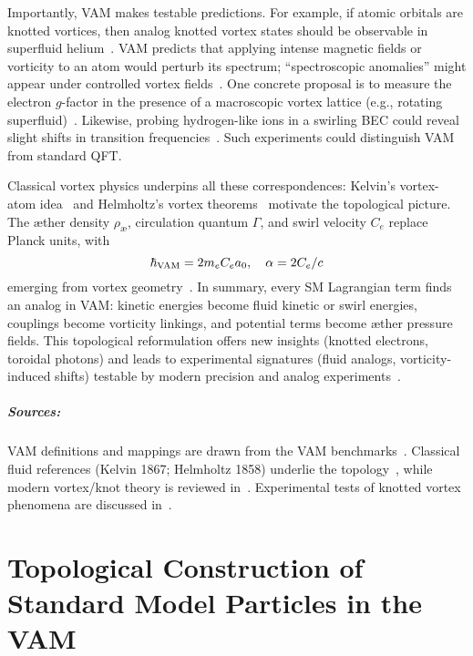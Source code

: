 \documentclass[a4paper,12pt]{article}
\begin{document}
Importantly, VAM makes testable predictions. For example, if atomic orbitals are knotted vortices, then analog knotted vortex states should be observable in superfluid helium~\cite{vam-analog}. VAM predicts that applying intense magnetic fields or vorticity to an atom would perturb its spectrum; ``spectroscopic anomalies'' might appear under controlled vortex fields~\cite{vam-spectroscopy}. One concrete proposal is to measure the electron $g$-factor in the presence of a macroscopic vortex lattice (e.g., rotating superfluid)~\cite{vam-gfactor}. Likewise, probing hydrogen-like ions in a swirling BEC could reveal slight shifts in transition frequencies~\cite{vam-bec1,vam-bec2}. Such experiments could distinguish VAM from standard QFT.

Classical vortex physics underpins all these correspondences: Kelvin's vortex-atom idea~\cite{kelvin-vortex} and Helmholtz's vortex theorems~\cite{helmholtz-vortex} motivate the topological picture. The æther density $\rho_{æ}$, circulation quantum $\Gamma$, and swirl velocity $C_e$ replace Planck units, with
\begin{equation}
    \hbar_{\rm VAM} = 2 m_e C_e a_0, \quad \alpha = 2C_e/c
\end{equation}
emerging from vortex geometry~\cite{vam-geometry1,vam-geometry2}. In summary, every SM Lagrangian term finds an analog in VAM: kinetic energies become fluid kinetic or swirl energies, couplings become vorticity linkings, and potential terms become æther pressure fields. This topological reformulation offers new insights (knotted electrons, toroidal photons) and leads to experimental signatures (fluid analogs, vorticity-induced shifts) testable by modern precision and analog experiments~\cite{vam-expt1,vam-expt2}.

\paragraph{Sources:} VAM definitions and mappings are drawn from the VAM benchmarks~\cite{vam-bench1,vam-bench2}. Classical fluid references (Kelvin 1867; Helmholtz 1858) underlie the topology~\cite{kelvin-vortex,helmholtz-vortex}, while modern vortex/knot theory is reviewed in~\cite{vam-knot1,vam-knot2}. Experimental tests of knotted vortex phenomena are discussed in~\cite{vam-expt3,vam-expt4}.



\chapter*{Topological Construction of Standard Model Particles in the VAM}
\end{document}

